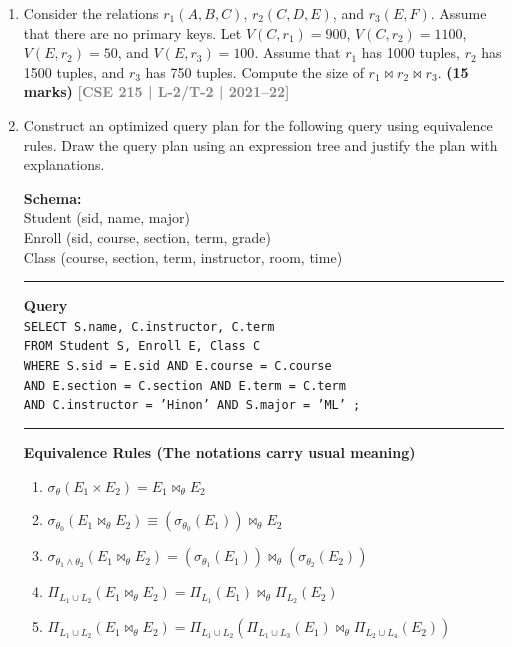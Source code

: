 \documentclass[12pt,a3paper]{article}
\newcommand{\yr}[1]{\hfill\textcolor{gray}{\small\textbf{[#1]}}}
\newcommand{\mk}[1]{\textcolor{orange!70!black}{\small\textbf{(#1 marks)}}}
\begin{document}
\begin{enumerate}
\item Consider the relations $r_1(A, B, C)$, $r_2(C, D, E)$, and $r_3(E, F)$. Assume that there are no primary keys. Let $V(C, r_1) = 900$, $V(C, r_2) = 1100$, $V(E, r_2) = 50$, and $V(E, r_3) = 100$. Assume that $r_1$ has 1000 tuples, $r_2$ has 1500 tuples, and $r_3$ has 750 tuples. Compute the size of $r_1 \bowtie r_2 \bowtie r_3$.
\mk{15} \yr{CSE 215 | L-2/T-2 | 2021--22}

\item Construct an optimized query plan for the following query using equivalence rules. Draw the query plan using an expression tree and justify the plan with explanations.


\vspace{0.2cm}
\textbf{Schema:} \\
Student (sid, name, major) \\
Enroll (sid, course, section, term, grade) \\
Class (course, section, term, instructor, room, time)

\vspace{0.2cm}
\hrule
\vspace{0.2cm}

\textbf{Query} \\
\texttt{SELECT S.name, C.instructor, C.term} \\
\texttt{FROM Student S, Enroll E, Class C} \\
\texttt{WHERE S.sid = E.sid AND E.course = C.course} \\
\texttt{AND E.section = C.section AND E.term = C.term} \\
\texttt{AND C.instructor = 'Hinon' AND S.major = 'ML' ;}

\vspace{0.2cm}
\hrule
\vspace{0.2cm}

\textbf{Equivalence Rules (The notations carry usual meaning)}
\begin{enumerate}
    \item $\sigma_{\theta}(E_1 \times E_2) = E_1 \bowtie_{\theta} E_2$
    \item $\sigma_{\theta_0}(E_1 \bowtie_{\theta} E_2) \equiv (\sigma_{\theta_0}(E_1)) \bowtie_{\theta} E_2$
    \item $\sigma_{\theta_1 \wedge \theta_2}(E_1 \bowtie_{\theta} E_2) = (\sigma_{\theta_1}(E_1)) \bowtie_{\theta} (\sigma_{\theta_2}(E_2))$
    \item $\Pi_{L_1 \cup L_2}(E_1 \bowtie_{\theta} E_2) = \Pi_{L_1}(E_1) \bowtie_{\theta} \Pi_{L_2}(E_2)$
    \item $\Pi_{L_1 \cup L_2}(E_1 \bowtie_{\theta} E_2) = \Pi_{L_1 \cup L_2}(\Pi_{L_1 \cup L_3}(E_1) \bowtie_{\theta} \Pi_{L_2 \cup L_4}(E_2))$
\end{enumerate}
\vspace{0.1cm}


\end{enumerate}
\end{document}
